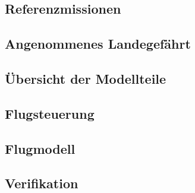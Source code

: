 \subsection{Referenzmissionen}


\subsection{Angenommenes Landegefährt}


\subsection{Übersicht der Modellteile}

	
\subsection{Flugsteuerung}

	
\subsection{Flugmodell}


\subsection{Verifikation}
